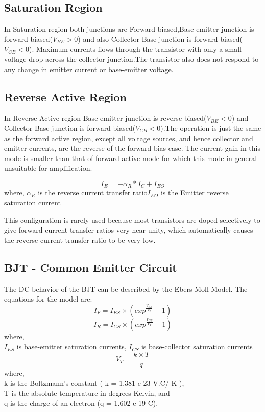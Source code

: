 		\subsection{Saturation Region}
			In Saturation region both junctions are Forward biased,Base-emitter junction is forward biased(\(V_{BE}>0\)) and also Collector-Base junction is forward biased(\(V_{CB}<0\)). Maximum currents flows through the transistor with only a small voltage drop across the collector junction.The transistor also does not respond to any change in emitter current or base-emitter voltage.
			
		\subsection{Reverse Active Region}
			In Reverse Active region Base-emitter junction is reverse biased(\(V_{BE}<0\)) and Collector-Base junction is forward biased(\(V_{CB}<0\)).The operation is just the same as the forward active region, except all voltage sources, and hence collector and emitter currents, are the reverse of the forward bias case. The current gain in this mode is smaller than that of forward active mode for which this mode in general unsuitable for amplification.
			
			
			$$I_E = -\alpha_R* I_C + I_{EO}$$ where,
			\(\alpha_R\) is the reverse current transfer ratio\newline \(I_{EO}\) is the Emitter reverse saturation current
			
			This configuration is rarely used because most transistors are doped selectively to give forward current transfer ratios very near unity, which automatically causes the reverse current transfer ratio to be very low.
		
		\subsection{BJT - Common Emitter Circuit}
			The DC behavior of the BJT can be described by the Ebers-Moll Model. The equations for the model are:
			$$I_F= I_{ES} \times ( exp^ \frac{V_{BE}}{V_T} -1)$$
			$$I_R= I_{CS} \times(exp^ \frac{V_{CB}}{V_T} -1)$$ where,\\
			\(I _{ES}\) is base-emitter saturation currents,
			\(I_{CS}\) is base-collector saturation currents
			$$V_T = \frac{k \times T}{q}$$
			where,\\
			k is the Boltzmann’s constant ( k = 1.381 e-23 V.C/ K ),\\
			T is the absolute temperature in degrees Kelvin, and\\
			q is the charge of an electron (q = 1.602 e-19 C).\\
			
